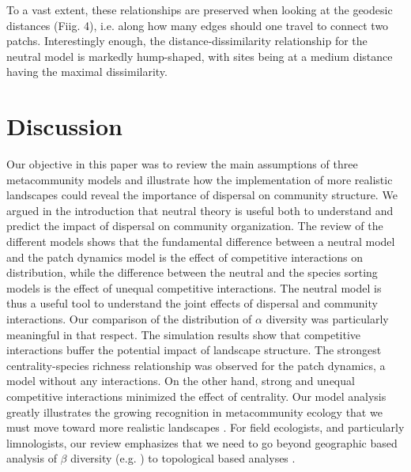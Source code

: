 \documentclass[12pt]{article}
\begin{document}
To a vast extent, these relationships are preserved when looking at the
geodesic distances (Fiig. 4), i.e. along how many edges should one travel to
connect two patchs. Interestingly enough, the distance-dissimilarity
relationship for the neutral model is markedly hump-shaped, with sites being at
a medium distance having the maximal dissimilarity.

\section*{Discussion}

Our objective in this paper was to review the main assumptions of three
metacommunity models and illustrate how the implementation of more realistic
landscapes could reveal the importance of dispersal on community structure. We
argued in the introduction that neutral theory is useful both to understand and
predict the impact of dispersal on community organization. The review of the
different models shows that the fundamental difference between a neutral model
and the patch dynamics model is the effect of competitive interactions on
distribution, while the difference between the neutral and the species sorting
models is the effect of unequal competitive interactions. The neutral model is
thus a useful tool to understand the joint effects of dispersal and community
interactions. Our comparison of the distribution of $\alpha$ diversity was
particularly meaningful in that respect. The simulation results show that
competitive interactions buffer the potential impact of landscape structure. The
strongest centrality-species richness relationship was observed for the patch
dynamics, a model without any interactions. On the other hand, strong and
unequal competitive interactions minimized the effect of centrality. Our model
analysis greatly illustrates the growing recognition in metacommunity ecology
that we must move toward more realistic landscapes \parencite{Gilarranz2012}.
For field ecologists, and particularly limnologists, our review emphasizes that
we need to go beyond geographic based analysis of $\beta$ diversity (e.g.
\parencite{Legendre2005}) to topological based analyses
\parencite{Peterson2013}.
\end{document}
